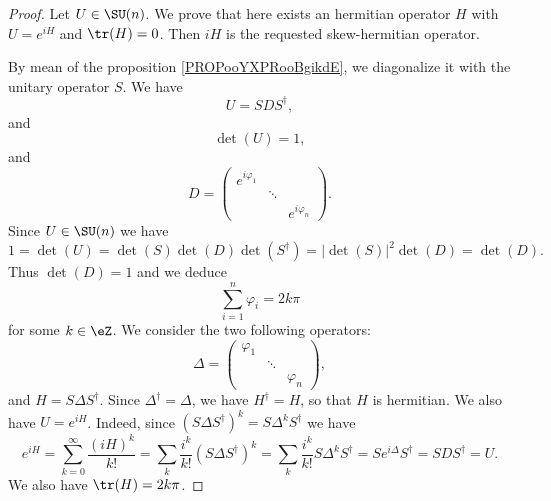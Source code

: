 \begin{proof}
    Let \( U\in \SU(n)\). We prove that here exists an hermitian operator \( H\) with \( U= e^{iH}\) and \( \tr(H)=0\). Then \( iH\) is the requested skew-hermitian operator.

    By mean of the proposition \ref{PROPooYXPRooBgikdE}, we diagonalize it with the unitary operator \( S\). We have 
    \begin{equation}
        U=SDS^{\dag},
    \end{equation}
    and
    \begin{equation}
        \det(U)=1,
    \end{equation}
    and
    \begin{equation}
        D=\begin{pmatrix}
            e^{i\varphi_1}    &       &       \\
                &   \ddots    &       \\
                &       &    e^{i\varphi_n}
        \end{pmatrix}.
    \end{equation}
    Since \( U\in\SU(n)\) we have
    \begin{equation}
        1=\det(U)=\det(S)\det(D)\det(S^{\dag})=| \det(S) |^2\det(D)=\det(D).
    \end{equation}
    Thus \( \det(D)=1\) and we deduce
    \begin{equation}
        \sum_{i=1}^n\varphi_i=2k\pi
    \end{equation}
    for some \( k\in \eZ\). We consider the two following  operators:
    \begin{equation}
        \Delta=\begin{pmatrix}
            \varphi_1    &       &       \\
                &   \ddots    &       \\
                &       &   \varphi_n
        \end{pmatrix},
    \end{equation}
    and \( H=S\Delta S^{\dag}\). Since \( \Delta^{\dag}=\Delta\), we have \( H^{\dag}=H\), so that \( H\) is hermitian. We also have \( U= e^{iH}\). Indeed, since \( (S\Delta S^{\dag})^k=S\Delta^kS^{\dag}\) we have
    \begin{equation}
        e^{iH}=\sum_{k=0}^{\infty}\frac{ (iH)^k }{ k! }=\sum_k\frac{ i^k }{ k! }(S\Delta S^{\dag})^k=\sum_k\frac{ i^k }{ k! }S\Delta^kS^{\dag}=S e^{i\Delta}S^{\dag}=SDS^{\dag}=U.
    \end{equation}
    We also have \( \tr(H)=2k\pi\).
    

\end{proof}
